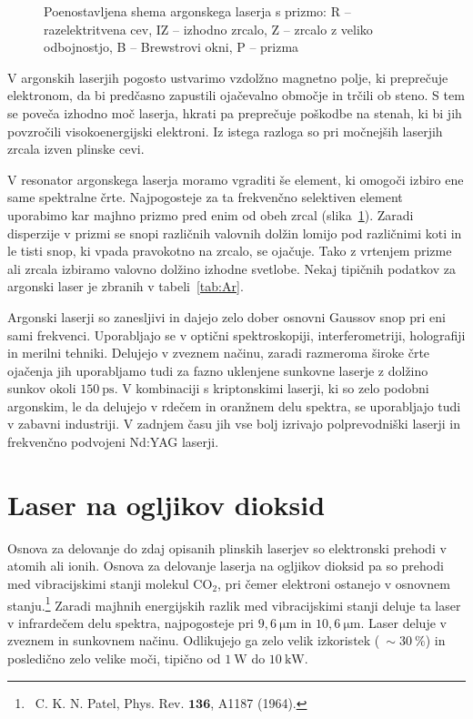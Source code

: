 \begin{figure}[ht]
\centering
\def\svgwidth{100truemm} 

\caption{Poenostavljena shema argonskega laserja s prizmo: R -- razelektritvena cev, 
IZ -- izhodno zrcalo, Z -- zrcalo z veliko odbojnostjo, B -- Brewstrovi okni,
P -- prizma
}
\label{fig:ArS}
\end{figure}

\begin{remark}
V argonskih laserjih pogosto ustvarimo vzdolžno magnetno polje, ki preprečuje 
elektronom, da bi predčasno zapustili ojačevalno območje in trčili ob steno. S
tem se poveča izhodno moč laserja, hkrati pa preprečuje poškodbe na stenah, ki bi jih 
povzročili visokoenergijski elektroni. Iz istega razloga so pri močnejših
laserjih zrcala izven plinske cevi. 
\end{remark}

V resonator argonskega laserja moramo vgraditi še element, ki omogoči
izbiro ene same spektralne črte. Najpogosteje za ta frekvenčno selektiven element
uporabimo kar majhno prizmo pred enim od obeh zrcal (slika~\ref{fig:ArS}). Zaradi disperzije
v prizmi se snopi različnih valovnih dolžin lomijo pod različnimi koti in le tisti 
snop, ki vpada pravokotno na zrcalo, se ojačuje. Tako z vrtenjem prizme ali zrcala 
izbiramo valovno dolžino izhodne svetlobe. Nekaj tipičnih podatkov za argonski
laser je zbranih v tabeli~\ref{tab:Ar}.

Argonski laserji so zanesljivi in dajejo zelo dober osnovni Gaussov snop pri eni
sami frekvenci. Uporabljajo se v optični spektroskopiji,
interferometriji, holografiji in merilni tehniki. Delujejo v zveznem načinu,
zaradi razmeroma široke črte ojačenja jih uporabljamo tudi za fazno uklenjene
sunkovne laserje z dolžino sunkov okoli $150~\si{\pico\second}$. 
V kombinaciji s kriptonskimi laserji, ki so zelo podobni argonskim, le da delujejo
v rdečem in oranžnem delu spektra, se uporabljajo tudi v zabavni industriji.
V zadnjem času jih vse bolj izrivajo polprevodniški laserji in frekvenčno
podvojeni Nd:YAG laserji. 

\section{Laser na ogljikov dioksid}
Osnova za delovanje do zdaj opisanih plinskih laserjev so elektronski prehodi
v atomih ali ionih. Osnova za delovanje laserja na ogljikov dioksid pa so 
prehodi med vibracijskimi stanji molekul 
CO$_2$, pri čemer elektroni ostanejo v osnovnem stanju.\footnote{~C. K. N. Patel,
Phys. Rev. $\mathbf{136}$, A1187 (1964).}
Zaradi majhnih energijskih razlik med vibracijskimi stanji deluje
ta laser v infrardečem delu spektra, najpogosteje pri 
$9,6~\si{\micro\metre}$ in $10,6~\si{\micro\metre}$. Laser deluje v zveznem
in sunkovnem načinu. Odlikujejo ga zelo velik izkoristek ($~\sim 30~\%$) in 
posledično zelo velike moči, tipično od $1~\si{\watt}$ do $10~\si{\kilo\watt}$. 

